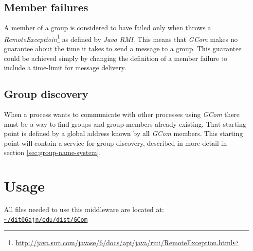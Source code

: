 \documentclass[titlepage, twocolumn, a4paper, 10pt]{article}
\def\pathtocode{\url{~/dit06ajn/edu/dist/GCom}}
\begin{document}

\subsection{Member failures}\label{sec:member-failures}
A member of a group is considered to have failed only when throws a
\textit{RemoteExceptioin}\footnote{\url{http://java.sun.com/javase/6/docs/api/java/rmi/RemoteException.html}}
as defined by \textit{Java RMI}. This means that \textit{GCom} makes
no guarantee about the time it takes to send a message to a group.
This guarantee could be achieved simply by changing the definition of
a member failure to include a time-limit for message delivery.

\subsection{Group discovery}\label{sec:group-discovery}
When a process wants to communicate with other processes using
\textit{GCom} there must be a way to find groups and group members
already existing. That starting point is defined by a global address
known by all \textit{GCom} members. This starting point will contain a
service for group discovery, described in more detail in section
\ref{sec:group-name-system}.


\section{Usage}\label{sec:usage}
All files needed to use this middleware are located at:\\
\texttt{\pathtocode}
\end{document}
